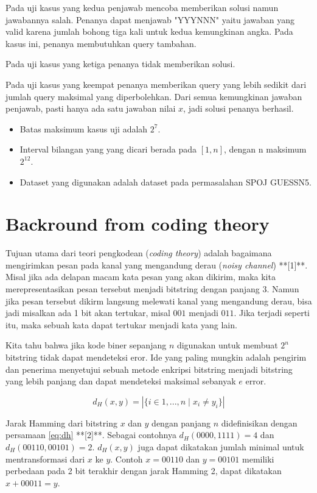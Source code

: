 \documentclass[conference,compsoc]{IEEEtran}
\begin{document}
Pada uji kasus yang kedua penjawab mencoba memberikan solusi namun jawabannya salah. Penanya dapat menjawab "YYYNNN" yaitu jawaban yang valid karena jumlah bohong tiga kali untuk kedua kemungkinan angka. Pada kasus ini, penanya membutuhkan query tambahan.

Pada uji kasus yang ketiga penanya tidak memberikan solusi.

Pada uji kasus yang keempat penanya memberikan query yang lebih sedikit dari jumlah query maksimal yang diperbolehkan. Dari semua kemungkinan jawaban penjawab, pasti hanya ada satu jawaban nilai $x$, jadi solusi penanya berhasil.

\begin{itemize}
  \item Batas maksimum kasus uji adalah $2^7$.
  \item Interval bilangan yang yang dicari berada pada $[1,n]$, dengan n maksimum $2^12$.
  \item Dataset yang digunakan adalah dataset pada permasalahan SPOJ GUESSN5.
\end{itemize}


\section{Backround from coding theory}

Tujuan utama dari teori pengkodean (\textit{coding theory}) adalah bagaimana mengirimkan pesan pada kanal yang mengandung derau (\textit{noisy channel}) **[1]**. Misal jika ada delapan macam kata pesan yang akan dikirim, maka kita merepresentasikan pesan tersebut menjadi bitstring dengan panjang 3. Namun jika pesan tersebut dikirm langsung melewati kanal yang mengandung derau, bisa jadi misalkan ada 1 bit akan tertukar, misal $001$ menjadi $011$. Jika terjadi seperti itu, maka sebuah kata dapat tertukar menjadi kata yang lain.

Kita tahu bahwa jika kode biner sepanjang $n$ digunakan untuk membuat $2^n$ bitstring tidak dapat mendeteksi eror. Ide yang paling mungkin adalah pengirim dan penerima menyetujui sebuah metode enkripsi bitstring menjadi bitstring yang lebih panjang dan dapat mendeteksi maksimal sebanyak $e$ error.

\begin{equation}
d_H(x,y) = |\{i \in {1,...,n} \mid x_i \neq y_i\}|
\label{eq:dh}
\end{equation}

Jarak Hamming dari bitstring $x$ dan $y$ dengan panjang $n$ didefinisikan dengan persamaan \ref{eq:dh} **[2]**. Sebagai contohnya $d_H(0000,1111)= 4$ dan $d_H(00110,00101)= 2$. $d_H(x,y)$ juga dapat dikatakan jumlah minimal untuk mentransformasi dari $x$ ke $y$. Contoh $x=00110$ dan $y=00101$ memiliki perbedaan pada 2 bit terakhir dengan jarak Hamming 2, dapat dikatakan $x+00011 = y$.
\end{document}
